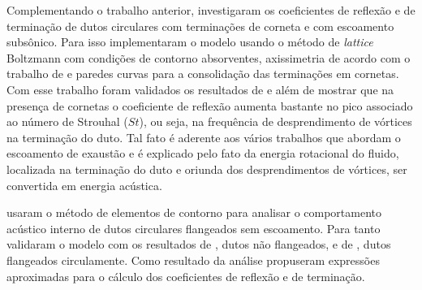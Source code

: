 Complementando o trabalho anterior,  investigaram os coeficientes de reflexão e de terminação de dutos circulares com terminações de corneta e com escoamento subsônico. Para isso implementaram o modelo usando o método de \textit{lattice} Boltzmann com condições de contorno absorventes, axissimetria de acordo com o trabalho de  e paredes curvas para a consolidação das terminações em cornetas. Com esse trabalho foram validados os resultados de  e  além de mostrar que na presença de cornetas o coeficiente de reflexão aumenta bastante no pico associado ao número de Strouhal ($St$), ou seja, na frequência de desprendimento de vórtices na terminação do duto. Tal fato é aderente aos vários trabalhos que abordam o escoamento de exaustão e é explicado pelo fato da energia rotacional do fluido, localizada na terminação do duto e oriunda dos desprendimentos de vórtices, ser convertida em energia acústica. 

 usaram o método de elementos de contorno para analisar o comportamento acústico interno de dutos circulares flangeados sem escoamento. Para tanto validaram o modelo com os resultados de , dutos não flangeados, e de , dutos flangeados circulamente. Como resultado da análise propuseram expressões aproximadas para o cálculo dos coeficientes de reflexão e de terminação.
